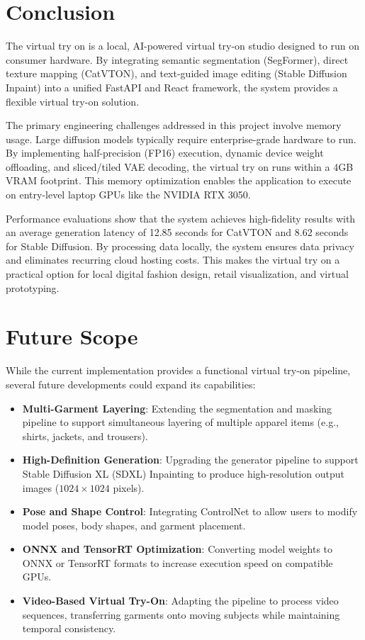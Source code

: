 \documentclass[12pt, a4paper]{report}
\begin{document}
\section{Conclusion}

The virtual try on is a local, AI-powered virtual try-on studio designed to run on consumer hardware. By integrating semantic segmentation (SegFormer), direct texture mapping (CatVTON), and text-guided image editing (Stable Diffusion Inpaint) into a unified FastAPI and React framework, the system provides a flexible virtual try-on solution.

The primary engineering challenges addressed in this project involve memory usage. Large diffusion models typically require enterprise-grade hardware to run. By implementing half-precision (FP16) execution, dynamic device weight offloading, and sliced/tiled VAE decoding, the virtual try on runs within a 4GB VRAM footprint. This memory optimization enables the application to execute on entry-level laptop GPUs like the NVIDIA RTX 3050.

Performance evaluations show that the system achieves high-fidelity results with an average generation latency of 12.85 seconds for CatVTON and 8.62 seconds for Stable Diffusion. By processing data locally, the system ensures data privacy and eliminates recurring cloud hosting costs. This makes the virtual try on a practical option for local digital fashion design, retail visualization, and virtual prototyping.

\section{Future Scope}

While the current implementation provides a functional virtual try-on pipeline, several future developments could expand its capabilities:

\begin{itemize}
\item \textbf{Multi-Garment Layering}: Extending the segmentation and masking pipeline to support simultaneous layering of multiple apparel items (e.g., shirts, jackets, and trousers).
\item \textbf{High-Definition Generation}: Upgrading the generator pipeline to support Stable Diffusion XL (SDXL) Inpainting to produce high-resolution output images ($1024 \times 1024$ pixels).
\item \textbf{Pose and Shape Control}: Integrating ControlNet to allow users to modify model poses, body shapes, and garment placement.
\item \textbf{ONNX and TensorRT Optimization}: Converting model weights to ONNX or TensorRT formats to increase execution speed on compatible GPUs.
\item \textbf{Video-Based Virtual Try-On}: Adapting the pipeline to process video sequences, transferring garments onto moving subjects while maintaining temporal consistency.
\end{itemize}
\end{document}
